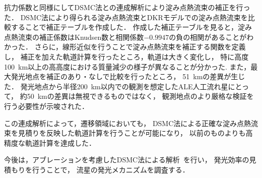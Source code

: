 %
抗力係数と同様にしてDSMC法との連成解析により淀み点熱流束の補正を行った．
DSMC法により得られる淀み点熱流束とDKRモデルでの淀み点熱流束を比較することで補正テーブルを作成した．
作成した補正テーブルを見ると，淀み点熱流束の補正係数はKnudsen数と相関係数$-0.9947$の負の相関があることがわかった．
さらに，線形近似を行うことで淀み点熱流束を補正する関数を定義し，
補正を加えた軌道計算を行ったところ，軌道は大きく変化し，
特に高度100~km以上の高高度における質量減少の様子が異なることが分かった.
また，最大発光地点を補正のあり・なしで比較を行ったところ，
51~kmの差異が生じた．
発光地点から半径200~km以内での観測を想定したALE人工流れ星にとって，
約50~kmの差異は無視できるものではなく，
観測地点のより厳格な検証を行う必要性が示唆された．
%
%

この連成解析によって，遷移領域においても，
DSMC法による正確な淀み点熱流束を見積りを反映した軌道計算を行うことが可能になり，
以前のものよりも高精度な軌道計算を達成した．

今後は，アブレーションを考慮したDSMC法による解析~\cite{bariselli2020aerothermodynamic}を行い，
発光効率の見積もりを行うことで，
流星の発光メカニズムを調査する．